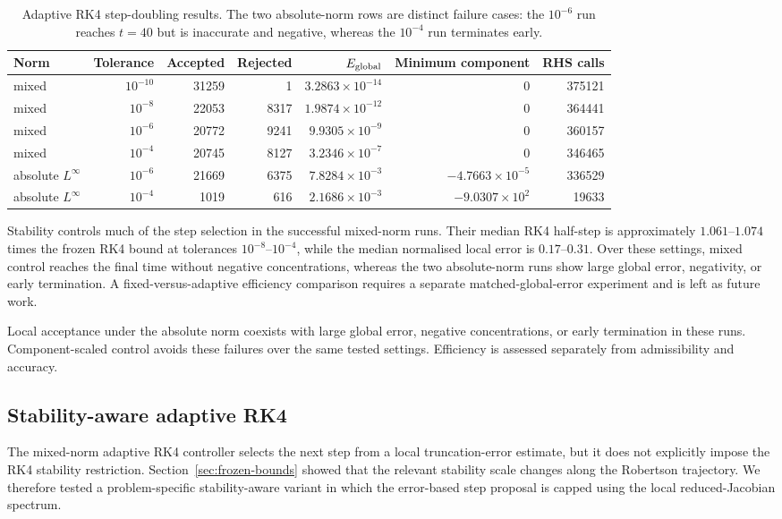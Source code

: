 \begin{table}[H]
\centering
\small
\caption{Adaptive RK4 step-doubling results. The two absolute-norm rows are distinct failure cases: the $10^{-6}$ run reaches $t=40$ but is inaccurate and negative, whereas the $10^{-4}$ run terminates early.}
\label{tab:adaptive-results}
\begin{tabular}{lrrrrrr}
\toprule
Norm&Tolerance&Accepted&Rejected&$E_{\rm global}$&Minimum component&RHS calls\\
\midrule
mixed&$10^{-10}$&31259&1&$3.2863\times10^{-14}$&$0$&375121\\
mixed&$10^{-8}$ &22053&8317&$1.9874\times10^{-12}$&$0$&364441\\
mixed&$10^{-6}$ &20772&9241&$9.9305\times10^{-9}$ &$0$&360157\\
mixed&$10^{-4}$ &20745&8127&$3.2346\times10^{-7}$ &$0$&346465\\
absolute $L^\infty$&$10^{-6}$&21669&6375&$7.8284\times10^{-3}$&$-4.7663\times10^{-5}$&336529\\
absolute $L^\infty$&$10^{-4}$&1019&616&$2.1686\times10^{-3}$&$-9.0307\times10^{2}$&19633\\
\bottomrule
\end{tabular}
\end{table}
Stability controls much of the step selection in the successful mixed-norm runs. Their median RK4 half-step is approximately $1.061$--$1.074$ times the frozen RK4 bound at tolerances $10^{-8}$--$10^{-4}$, while the median normalised local error is $0.17$--$0.31$. Over these settings, mixed control reaches the final time without negative concentrations, whereas the two absolute-norm runs show large global error, negativity, or early termination. A fixed-versus-adaptive efficiency comparison requires a separate matched-global-error experiment and is left as future work.

Local acceptance under the absolute norm coexists with large global error, negative concentrations, or early termination in these runs. Component-scaled control avoids these failures over the same tested settings. Efficiency is assessed separately from admissibility and accuracy.

\subsection{Stability-aware adaptive RK4}
\label{sec:stability-aware-rk4}
The mixed-norm adaptive RK4 controller selects the next step from a local truncation-error estimate, but it does not explicitly impose the RK4 stability restriction. Section~\ref{sec:frozen-bounds} showed that the relevant stability scale changes along the Robertson trajectory. We therefore tested a problem-specific stability-aware variant in which the error-based step proposal is capped using the local reduced-Jacobian spectrum.

